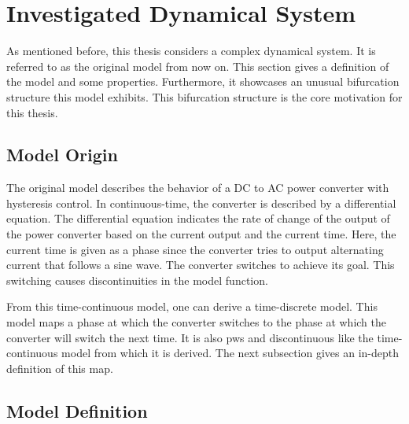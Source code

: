 \section{Investigated Dynamical System}
\label{sec:state.og}

As mentioned before, this thesis considers a complex dynamical system.
It is referred to as the original model from now on.
This section gives a definition of the model and some properties.
Furthermore, it showcases an unusual bifurcation structure this model exhibits.
This bifurcation structure is the core motivation for this thesis.

\subsection{Model Origin}
\label{sec:state.og.orig}

The original model describes the behavior of a DC to AC power converter with hysteresis control.
In continuous-time, the converter is described by a differential equation.
The differential equation indicates the rate of change of the output of the power converter based on the current output and the current time.
Here, the current time is given as a phase since the converter tries to output alternating current that follows a sine wave.
The converter switches to achieve its goal.
This switching causes discontinuities in the model function.

From this time-continuous model, one can derive a time-discrete model.
This model maps a phase at which the converter switches to the phase at which the converter will switch the next time.
It is also \gls{pws} and discontinuous like the time-continuous model from which it is derived.
The next subsection gives an in-depth definition of this map.

\subsection{Model Definition}
\label{sec:state.og.def}

